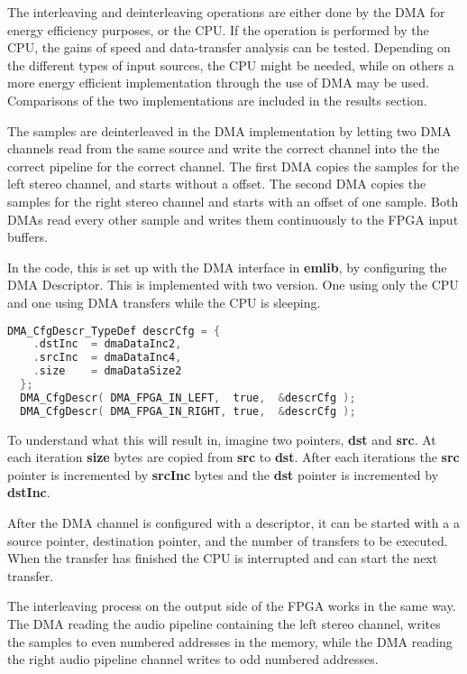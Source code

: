 
The interleaving and deinterleaving operations are either done by the DMA for
energy efficiency purposes, or the CPU. If the operation is performed by the
CPU, the gains of speed and data-transfer analysis can be tested. Depending on
the different types of input sources, the CPU might be needed, while on others a
more energy efficient implementation through the use of DMA may be used.
Comparisons of the two implementations are included in the results section.

The samples are deinterleaved in the DMA implementation by letting two DMA
channels read from the same source and write the correct channel into the the
correct pipeline for the correct channel. The first DMA copies the samples for
the left stereo channel, and starts without a offset. The second DMA copies the
samples for the right stereo channel and starts with an offset of one sample.
Both DMAs read every other sample and writes them continuously to the FPGA input
buffers.

In the code, this is set up with the DMA interface in {\bf emlib}, by
configuring the DMA Descriptor.  This is implemented with two
version. One using only the CPU and one using DMA transfers while the CPU is
sleeping.

\begin{lstlisting}[language=C, label=mcu:datapah1, caption=Håvard Fyll Inn]
  DMA_CfgDescr_TypeDef descrCfg = {
    .dstInc  = dmaDataInc2,
    .srcInc  = dmaDataInc4,
    .size    = dmaDataSize2
  };
  DMA_CfgDescr( DMA_FPGA_IN_LEFT,  true,  &descrCfg );
  DMA_CfgDescr( DMA_FPGA_IN_RIGHT, true,  &descrCfg );
\end{lstlisting}

To understand what this will result in, imagine two pointers, {\bf dst} and {\bf
src}. At each iteration {\bf size} bytes are copied from {\bf src} to {\bf dst}.
After each iterations the {\bf src} pointer is incremented by {\bf srcInc} bytes
and the {\bf dst} pointer is incremented by {\bf dstInc}.

After the DMA channel is configured with a descriptor, it can be started with a
a source pointer, destination pointer, and the number of transfers to be
executed. When the transfer has finished the CPU is interrupted and can start
the next transfer.

The interleaving process on the output side of the FPGA works in the same way.
The DMA reading the audio pipeline containing the left stereo channel, writes
the samples to even numbered addresses in the memory, while the DMA reading the
right audio pipeline channel writes to odd numbered addresses.

